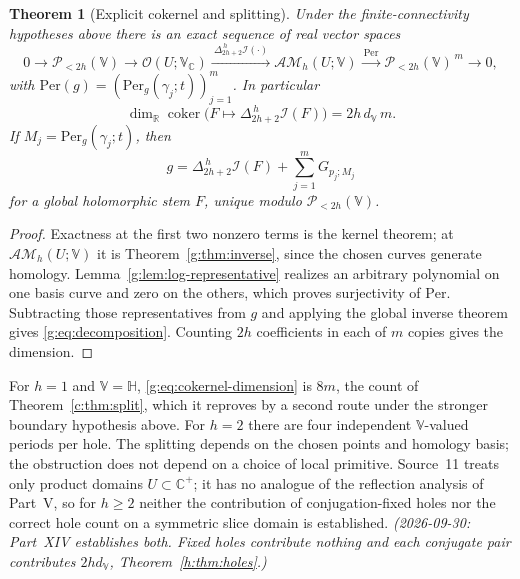 \documentclass[11pt,a4paper]{article}
\numberwithin{equation}{section}
\newtheorem{theorem}{Theorem}[section]
\theoremstyle{definition}
\theoremstyle{remark}
\theoremstyle{plain}
\newcommand{\HH}{\mathbb H}
\newcommand{\RR}{\mathbb R}
\newcommand{\CC}{\mathbb C}
\newcommand{\Cplus}{\CC^{+}}
\newcommand{\I}{\mathcal I}
\newcommand{\AM}{\mathcal{AM}}
\newcommand{\Per}{\mathrm{Per}}
\newcommand{\lapH}{\Delta_{2h+2}^{\,h}}
\newcommand{\VV}{\mathbb V}                       %
\newcommand{\VC}{\mathbb V_{\CC}}                 %
\newcommand{\dV}{d_{\VV}}                         %
\newcommand{\PolH}{\mathscr P_{<2h}(\VV)}
\begin{document}
\begin{theorem}[Explicit cokernel and splitting]
\label{g:thm:cokernel}
Under the finite-connectivity hypotheses above there is an exact sequence of
real vector spaces
\begin{equation}\label{g:eq:exact-sequence}
 0\longrightarrow\PolH\longrightarrow\mathcal O(U;\VC)
 \xrightarrow{\ \lapH\I(\cdot)\ }\AM_h(U;\VV)
 \xrightarrow{\ \Per\ }\PolH^{\,m}\longrightarrow0,
\end{equation}
with $\Per(g)=(\Per_g(\gamma_j;t))_{j=1}^m$. In particular
\begin{equation}\label{g:eq:cokernel-dimension}
 \dim_\RR\operatorname{coker}\bigl(F\mapsto\lapH\I(F)\bigr)=2h\,\dV\,m .
\end{equation}
If $M_j=\Per_g(\gamma_j;t)$, then
\begin{equation}\label{g:eq:decomposition}
 g=\lapH\I(F)+\sum_{j=1}^mG_{p_j;M_j}
\end{equation}
for a global holomorphic stem $F$, unique modulo $\PolH$.
\end{theorem}

\begin{proof}
Exactness at the first two nonzero terms is the kernel theorem; at
$\AM_h(U;\VV)$ it is Theorem~\ref{g:thm:inverse}, since the chosen curves
generate homology. Lemma~\ref{g:lem:log-representative} realizes an
arbitrary polynomial on one basis curve and zero on the others, which proves
surjectivity of $\Per$. Subtracting those representatives from $g$ and
applying the global inverse theorem gives \eqref{g:eq:decomposition}.
Counting $2h$ coefficients in each of $m$ copies gives the dimension.
\end{proof}

For $h=1$ and $\VV=\HH$, \eqref{g:eq:cokernel-dimension} is $8m$, the count of
Theorem~\ref{c:thm:split}, which it reproves by a second route under the
stronger boundary hypothesis above. For $h=2$ there are four independent
$\VV$-valued periods per hole. The splitting depends on the chosen points and
homology basis; the obstruction does not depend on a choice of local
primitive. Source~11 treats only product domains $U\subset\Cplus$; it has no
analogue of the reflection analysis of Part~V, so for $h\ge2$ neither the
contribution of conjugation-fixed holes nor the correct hole count on a
symmetric slice domain is established. \emph{(2026-09-30: Part~XIV
establishes both. Fixed holes contribute nothing and each conjugate pair
contributes $2h\dV$, Theorem~\ref{h:thm:holes}.)}
\end{document}
